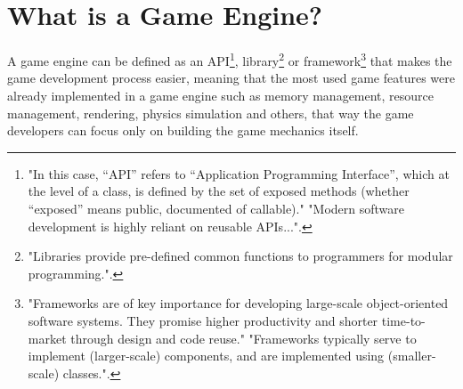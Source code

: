 \section{What is a Game Engine?}
A game engine can be defined as an API\footnote{"In this case, “API” refers to “Application Programming Interface”, which at the level of a class, is defined by the set of exposed methods (whether “exposed” means public, documented of callable)."\cite{MendezBaudryMonperrus} "Modern software development is highly reliant on reusable APIs..."\cite{Bierhoff}.}, library\footnote{"Libraries provide pre-defined common functions to programmers for modular programming."\cite{Simsek}.} or framework\footnote{"Frameworks are of key importance for developing large-scale object-oriented software systems. They promise higher productivity and shorter time-to-market through design and code reuse." "Frameworks typically serve to implement (larger-scale) components, and are implemented using (smaller-scale) classes."\cite{FrameworkDesign}.} that makes the game development process easier, meaning that the most used game features were already implemented in a game engine such as memory management, resource management, rendering, physics simulation and others, that way the game developers can focus only on building the game mechanics itself\cite{3DGameEngineArchitecture}.



